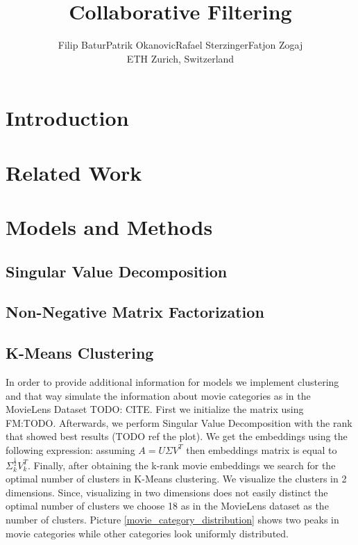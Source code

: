 \documentclass[10pt,conference,compsocconf]{IEEEtran}
\newcommand{\spacing}{\hspace{1cm}}
\begin{document}
    \title{Collaborative Filtering}

    \author{
    Filip Batur\spacing Patrik Okanovic\spacing Rafael Sterzinger\spacing Fatjon Zogaj\\
    ETH Zurich, Switzerland
    }

    \maketitle

    \begin{abstract}

    \end{abstract}


    \section{Introduction}


    \section{Related Work}


    \section{Models and Methods}

    \subsection{Singular Value Decomposition}

    \subsection{Non-Negative Matrix Factorization}
    
    \subsection{K-Means Clustering}
    
    In order to provide additional information for models we implement clustering and that way simulate the information about movie categories as in the MovieLens Dataset TODO: CITE. First we initialize the matrix using FM:TODO. Afterwards, we perform Singular Value Decomposition with the rank that showed best results (TODO ref the plot). We get the embeddings using the following expression: assuming $A=U\Sigma V^T$ then embeddings matrix is equal to $\Sigma _k ^{\frac{1}{2}} V_k ^T$. Finally, after obtaining the k-rank movie embeddings we search for the optimal number of clusters in K-Means clustering. We visualize the clusters in 2 dimensions. Since, visualizing in two dimensions does not easily distinct the optimal number of clusters we choose 18 as in the MovieLens dataset as the number of clusters. Picture \ref{movie_category_distribution} shows two peaks in movie categories while other categories look uniformly distributed.
    
\end{document}
